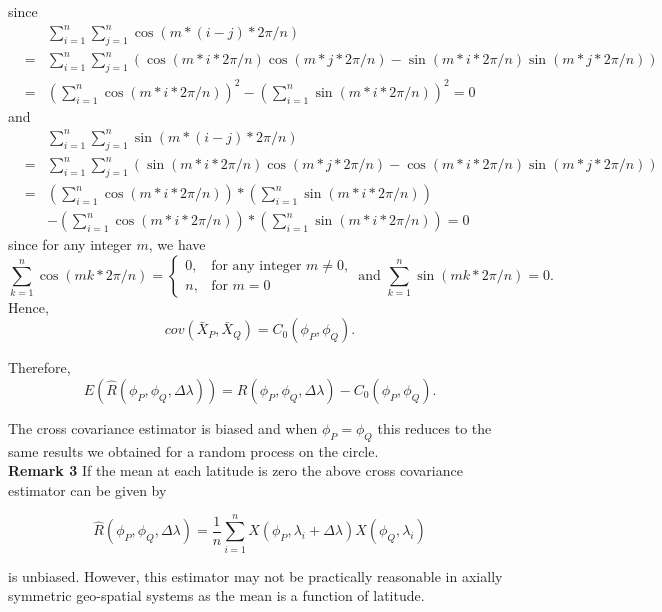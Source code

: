 			since
			\begin{eqnarray*}
				& & \sum_{i = 1}^n \sum_{j=1}^n \cos(m*(i-j)*2\pi/n) \\
				&=& \sum_{i=1}^n \sum_{j=1}^n \left(\cos(m*i *2\pi/n)\cos(m*j*2\pi/n) - \sin(m*i *2\pi/n)\sin(m*j*2\pi/n) \right)\\
				&=& \left(\sum_{i=1}^n \cos(m*i *2\pi/n)\right)^2 - \left(\sum_{i=1}^n \sin(m*i *2\pi/n)\right)^2 = 0
			\end{eqnarray*}
			and
			\begin{eqnarray*}
				& & \sum_{i = 1}^n \sum_{j=1}^n \sin(m*(i-j)*2\pi/n) \\
				&=& \sum_{i=1}^n \sum_{j=1}^n \left(\sin(m*i *2\pi/n)\cos(m*j*2\pi/n) - \cos(m*i *2\pi/n)\sin(m*j*2\pi/n) \right)\\
				&=& \left(\sum_{i=1}^n \cos(m*i *2\pi/n)\right)* \left(\sum_{i=1}^n \sin(m*i *2\pi/n)\right) \\
				& & - \left(\sum_{i=1}^n \cos(m*i *2\pi/n)\right)* \left(\sum_{i=1}^n \sin(m*i *2\pi/n)\right) = 0
			\end{eqnarray*}
			since for any integer $m$, we have
			\[
				\sum_{k = 1}^{n} \cos(mk*2\pi/n) = \left\{\begin{array}{cc}
				0, & \mbox{for any integer $m \ne 0$,}  \\
				n, & \mbox{for $m = 0$}
				\end{array}
				\right. \mbox{ and }
				\sum_{k = 1}^{n} \sin(mk*2\pi/n) = 0.
			\]
			Hence,
			\[
				cov(\bar{X}_P, \bar{X}_Q) = C_0 (\phi_P, \phi_Q).
			\]
				
			Therefore,
			\[
				E(\hat{R}(\phi_P, \phi_Q, \Delta \lambda)) = R(\phi_P, \phi_Q, \Delta \lambda) - C_0 (\phi_P, \phi_Q).
			\]
				
			The cross covariance estimator is biased and  when $\phi_P = \phi_Q$ this reduces to the same results we obtained for a random process on the circle.\\
				
			{\bf Remark 3} If the mean at each latitude is zero the above cross covariance estimator can be given by 
				
			\[ 
				\hat{R}(\phi_P, \phi_Q, \Delta \lambda)= \frac{1}{n}\sum_{i = 1}^n X(\phi_P, \lambda_i + \Delta \lambda)X(\phi_Q, \lambda_i)
			\]
				
			is unbiased. However, this estimator may not be practically reasonable in axially symmetric geo-spatial systems as the mean is a function of latitude.  
			
					
